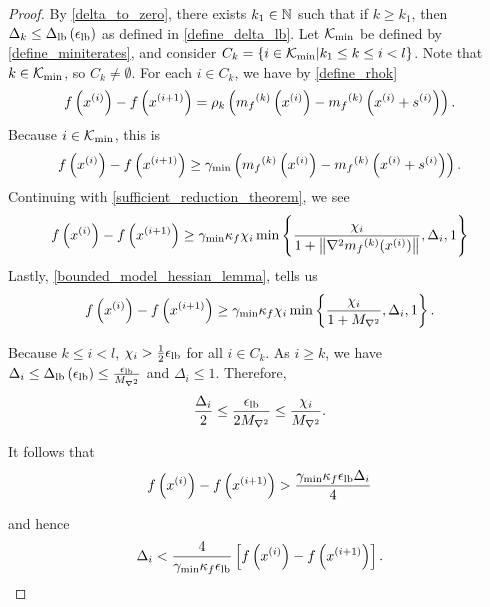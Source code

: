 \begin{proof}
By \cref{delta_to_zero}, there exists $k_1 \in \mathbb N$ such that if $k \ge k_1$, 
then $\Delta_k \le{\Delta_{\textrm{lb}}\left(\epsilon_{\textrm{lb}}\right)}$ as defined in \cref{define_delta_lb}.
Let ${\mathcal K_{\textrm{min}}}$ be defined by \cref{define_miniterates}, and consider
$C_k = \left\{i \in {\mathcal K_{\textrm{min}}} | k_1 \le k \le i < l \right\}$.
Note that $k \in {\mathcal K_{\textrm{min}}}$, so $C_k \ne \emptyset $.
For each $i \in C_k$, we have by \cref{define_rhok}
\begin{align*}
f\left(x^{(i)}\right) - f\left(x^{(i+1)}\right) 
= \rho_k \left( {{m}_f}^{(k)}\left(x^{(i)}\right) - {{m}_f}^{(k)}\left(x^{(i)} + s^{(i)}\right) \right).
\end{align*}
Because $i \in {\mathcal K_{\textrm{min}}}$, this is
\begin{align*}
f\left(x^{(i)}\right) - f\left(x^{(i+1)}\right) \ge \gamma_{\textrm{min}} \left( {{m}_f}^{(k)}\left(x^{(i)}\right) - {{m}_f}^{(k)}\left(x^{(i)} + s^{(i)}\right) \right).
\end{align*}
Continuing with \cref{sufficient_reduction_theorem}, we see
\begin{align*}
f\left(x^{(i)}\right) - f\left(x^{(i+1)}\right)\ge \gamma_{\textrm{min}} \kappa_f \chi_i \min\left\{\frac{\chi_i}{1+\left\|\nabla^2 {{m}_f}^{(k)}(x^{(i)})\right\|}, \Delta_i, 1\right\} 
\end{align*}
Lastly, \cref{bounded_model_hessian_lemma}, tells us
\begin{align*}
f\left(x^{(i)}\right) - f\left(x^{(i+1)}\right)\ge \gamma_{\textrm{min}} \kappa_f \chi_i \min\left\{\frac{\chi_{i}}{1 + {M_{\nabla^2}}}, \Delta_i, 1\right\}.
\end{align*}

Because $ k \le i < l$, $\chi_i > \frac 1 2 {\epsilon_{\textrm{lb}}}$ for all $i \in C_k$.
As $i \ge k$, we have $\Delta_i \le {\Delta_{\textrm{lb}}\left(\epsilon_{\textrm{lb}}\right)} \le \frac{{\epsilon_{\textrm{lb}}}}{{M_{\nabla^2}}}$ and $\Delta_i \le 1$.
Therefore,
\begin{align*}
\frac{\Delta_i}{2} \le \frac{{\epsilon_{\textrm{lb}}}}{2 {M_{\nabla^2}}} \le \frac{\chi_i}{{M_{\nabla^2}}}.
\end{align*}

It follows that
\begin{align*}
f\left(x^{(i)}\right) - f\left(x^{(i+1)}\right) > \frac{\gamma_{\textrm{min}} \kappa_f {\epsilon_{\textrm{lb}}} \Delta_i}{4}
\end{align*}

and hence
\begin{align*}
\Delta_i < \frac{4}{\gamma_{\textrm{min}} \kappa_f {\epsilon_{\textrm{lb}}}} \left[ f\left(x^{(i)}\right) - f\left(x^{(i+1)}\right)\right].
\end{align*}


\end{proof}

